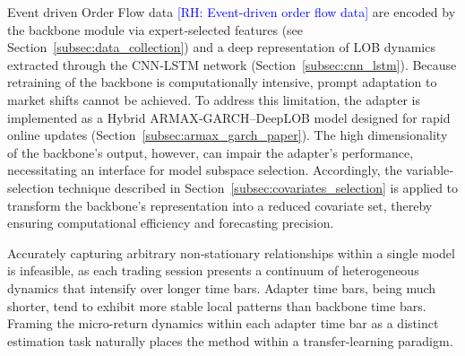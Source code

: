 \documentclass[10pt,a4paper,oneside]{article}
\newcommand{\rh}[1]{\textcolor{blue}{\textsf{[RH: #1]}}}
\providecommand{\DIFdeltex}[1]{{\protect\color{red} \scriptsize #1}} %
\providecommand{\DIFdelbegin}{} %
\providecommand{\DIFdelend}{} %
\providecommand{\DIFdel}[1]{\texorpdfstring{\DIFdeltex{#1}}{}} %
\newcommand{\DIFscaledelfig}{0.5}
\newlength{\DIFdelgraphicswidth} %
\newlength{\DIFdelgraphicsheight} %
\newcommand{\DIFdelincludegraphics}[2][]{%
\sbox{\DIFdelgraphicsbox}{\DIFOincludegraphics[#1]{#2}}%
\settoboxwidth{\DIFdelgraphicswidth}{\DIFdelgraphicsbox} %
\settoboxtotalheight{\DIFdelgraphicsheight}{\DIFdelgraphicsbox} %
\scalebox{\DIFscaledelfig}{%
\parbox[b]{\DIFdelgraphicswidth}{\usebox{\DIFdelgraphicsbox}\\[-\baselineskip] \rule{\DIFdelgraphicswidth}{0em}}\llap{\resizebox{\DIFdelgraphicswidth}{\DIFdelgraphicsheight}{%
\setlength{\unitlength}{\DIFdelgraphicswidth}%
\begin{picture}(1,1)%
\thicklines\linethickness{2pt} %
{\color[rgb]{1,0,0}\put(0,0){\framebox(1,1){}}}%
{\color[rgb]{1,0,0}\put(0,0){\line( 1,1){1}}}%
{\color[rgb]{1,0,0}\put(0,1){\line(1,-1){1}}}%
\end{picture}%
}\hspace*{3pt}}} %
} %
\DeclareRobustCommand{\DIFdelbegin}{\DIFOdelbegin \let\includegraphics\DIFdelincludegraphics} %
\DeclareRobustCommand{\DIFdelend}{\DIFOaddend \let\includegraphics\DIFOincludegraphics} %
\begin{document}
Event driven Order Flow data \DIFdelbegin \DIFdel{\rh{Event-driven order flow data} }\DIFdelend are encoded by the backbone module via expert‐selected features (see Section~\ref{subsec:data_collection}) and a deep representation of LOB dynamics extracted through the CNN‐LSTM network (Section~\ref{subsec:cnn_lstm}).  Because retraining of the backbone is computationally intensive, prompt adaptation to market shifts cannot be achieved.  To address this limitation, the adapter is implemented as a Hybrid ARMAX‐GARCH–DeepLOB model designed for rapid online updates (Section~\ref{subsec:armax_garch_paper}).  The high dimensionality of the backbone’s output, however, can impair the adapter’s performance, necessitating an interface for model subspace selection.  Accordingly, the variable‐selection technique described in Section~\ref{subsec:covariates_selection} is applied to transform the backbone’s representation into a reduced covariate set, thereby ensuring computational efficiency and forecasting precision.

Accurately capturing arbitrary non‐stationary relationships within a single model is infeasible, as each trading session presents a continuum of heterogeneous dynamics that intensify over longer time bars. Adapter time bars, being much shorter, tend to exhibit more stable local patterns than backbone time bars. Framing the micro-return dynamics within each adapter time bar as a distinct estimation task naturally places the method within a transfer-learning paradigm.
\end{document}
